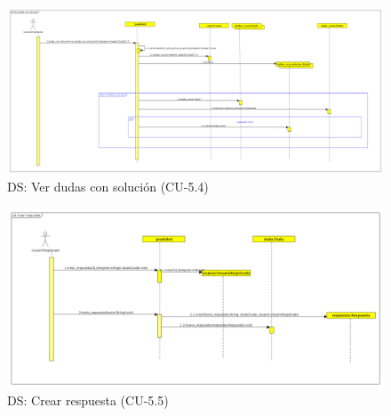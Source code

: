 \begin{figure}[H] %
\centering
\includegraphics[scale=0.19]{imagenes/diagramas/secuencia/analisis/ver_dudas_resueltas.png}  %

\caption{DS: Ver dudas con solución (CU-5.4) }\label{figura85}

\end{figure}


\begin{figure}[H] %
\centering
\includegraphics[scale=0.25]{imagenes/diagramas/secuencia/analisis/crear_respuesta.png}  %

\caption{DS: Crear respuesta (CU-5.5) }\label{figura86}

\end{figure}

